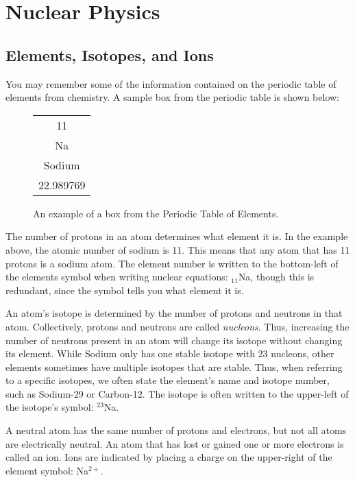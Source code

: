 \chapter{Nuclear Physics}
\label{chap:nuclear}

\section{Elements, Isotopes, and Ions}    
You may remember some of the information contained on the periodic table of elements from chemistry.  A sample box from the periodic table is shown below: 

\begin{figure}[h]
	\begin{center}
	\begin{tabular}{|c| }
		\hline
		\color{red}11\color{black}\\
		\huge{Na}\\
		Sodium\\
		\color{blue}22.989769\color{black}\\
		\hline
	\end{tabular}
\caption{An example of a box from the Periodic Table of Elements.}
	\end{center}
\end{figure}

The number of protons in an atom determines what element it is.  In the example above, the atomic number of sodium is \color{red}11\color{black}.  This means that any atom that has 11 protons is a sodium atom.  The element number is written to the bottom-left of the elements symbol when writing nuclear equations: $_{11}$Na, though this is redundant, since the symbol tells you what element it is.

An atom's isotope is determined by the number of protons and neutrons in that atom.  Collectively, protons and neutrons are called \textit{nucleons}.  Thus, increasing the number of neutrons present in an atom will change its isotope without changing its element.  While Sodium only has one stable isotope with 23 nucleons, other elements sometimes have multiple isotopes that are stable.  Thus, when referring to a specific isotopes, we often state the element's name and isotope number, such as Sodium-29 or Carbon-12.  The isotope is often written to the upper-left of the isotope's symbol: $^{23}$Na.    

A neutral atom has the same number of protons and electrons, but not all atoms are electrically neutral.  An atom that has lost or gained one or more electrons is called an ion.  Ions are indicated by placing a charge on the upper-right of the element symbol: Na$^{2+}$.


